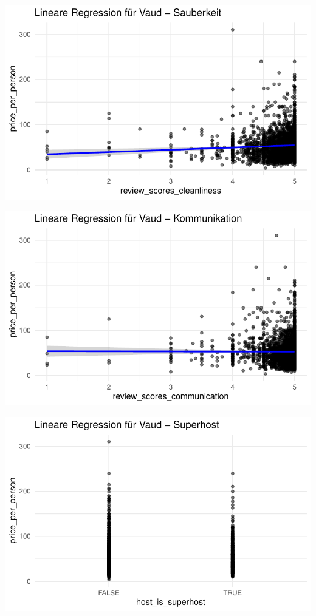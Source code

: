 \documentclass[
  journal,
]{IEEEtran}%
\begin{document}
\includegraphics{main_files/figure-pdf/unnamed-chunk-14-2.pdf}

\includegraphics{main_files/figure-pdf/unnamed-chunk-14-3.pdf}

\includegraphics{main_files/figure-pdf/unnamed-chunk-14-4.pdf}
\end{document}
